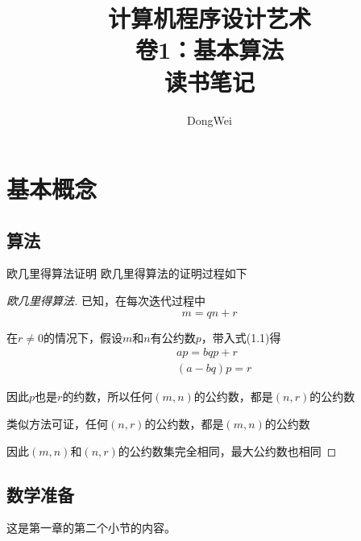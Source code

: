 \documentclass[openany,UTF8]{ctexbook}
\title{计算机程序设计艺术\\卷1：基本算法\\读书笔记}
\author{DongWei}
\date{}
\begin{document}
\maketitle

\tableofcontents

\newpage

\chapter{基本概念}
\section{算法}

{欧几里得算法证明}
欧几里得算法的证明过程如下

\begin{proof}[欧几里得算法]
  已知，在每次迭代过程中
  \begin{equation}
    m=qn+r
  \end{equation}

  在$r\neq0$的情况下，假设$m$和$n$有公约数$p$，带入式(1.1)得
  \begin{equation}
    \begin{aligned}
      &ap=bqp+r \\
      &(a-bq)p=r
    \end{aligned}
  \end{equation}
  
  因此$p$也是$r$的约数，所以任何$(m,n)$的公约数，都是$(n,r)$的公约数
  
  类似方法可证，任何$(n,r)$的公约数，都是$(m,n)$的公约数
  
  因此$(m,n)$和$(n,r)$的公约数集完全相同，最大公约数也相同
\end{proof}

\section{数学准备}
这是第一章的第二个小节的内容。
\end{document}
